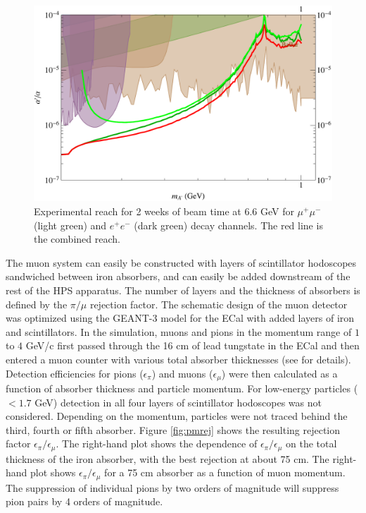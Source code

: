 \begin{figure}[!ht]
\includegraphics[scale=0.7]{muon/HPS_reach_muon.pdf}
\caption{\small{Experimental reach for 2 weeks of beam time at 6.6 GeV for $\mu^+\mu^-$ (light green) and $e^+e^-$ (dark green) decay channels. 
The red line is the combined reach.}}\label{fig:mureach}
\end{figure}


The muon system can easily be constructed with layers of scintillator hodoscopes sandwiched between iron absorbers, and can easily be added 
downstream of the rest of the HPS apparatus.
The number of layers and the thickness of absorbers is defined by the $\pi/\mu$ rejection factor. The schematic design of the muon 
detector was optimized using the GEANT-3 model for the ECal with added layers of iron and scintillators.  In the simulation, muons 
and pions in the momentum range of $1$ to $4$ GeV/c first passed through the 16 cm of lead tungstate in the ECal and then entered a 
muon counter with various total absorber thicknesses (see \cite{HPS_PROP} for details).  Detection efficiencies for pions ($\epsilon_\pi$) 
and muons ($\epsilon_\mu$) were then calculated as a function of absorber thickness and particle momentum.  For low-energy 
particles ($< 1.7$ GeV) detection in all four layers of scintillator hodoscopes was not considered. Depending on the momentum, particles 
were not traced behind the third, fourth or fifth absorber.  
Figure \ref{fig:pmrej} shows the resulting rejection factor $\epsilon_\pi/\epsilon_\mu$.  The right-hand plot shows the
dependence of  $\epsilon_\pi/\epsilon_\mu$ on the total thickness of the iron absorber, with the best rejection at about 75 cm.  
The right-hand plot shows $\epsilon_\pi/\epsilon_\mu$ for a 75 cm absorber as a function of muon momentum.  The suppression of 
individual pions by two orders of magnitude will suppress pion pairs by 4 orders of magnitude.  


